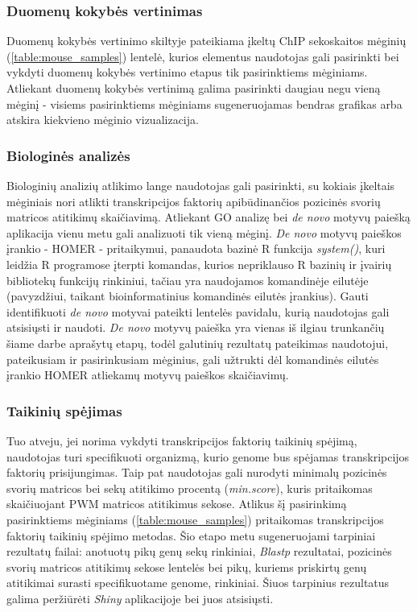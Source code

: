 \documentclass[12pt]{article}
\begin{document}
\subsubsection*{Duomenų kokybės vertinimas}
Duomenų kokybės vertinimo skiltyje pateikiama įkeltų ChIP sekoskaitos mėginių
(\ref{table:mouse_samples}) lentelė, kurios elementus naudotojas gali
pasirinkti bei vykdyti duomenų kokybės vertinimo etapus tik pasirinktiems
mėginiams. Atliekant duomenų kokybės vertinimą galima pasirinkti daugiau negu
vieną mėginį - visiems pasirinktiems mėginiams sugeneruojamas bendras grafikas
arba atskira kiekvieno mėginio vizualizacija.

\subsubsection*{Biologinės analizės}
Biologinių analizių atlikimo lange naudotojas gali pasirinkti, su kokiais
įkeltais mėginiais nori atlikti transkripcijos faktorių apibūdinančios pozicinės
svorių matricos atitikimų skaičiavimą. Atliekant GO analizę bei \emph{de novo}
motyvų paiešką aplikacija vienu metu gali analizuoti tik vieną mėginį.
\emph{De novo} motyvų paieškos įrankio - HOMER - pritaikymui, panaudota bazinė R
funkcija \emph{system()}, kuri leidžia R programose įterpti komandas, kurios
nepriklauso R bazinių ir įvairių bibliotekų funkcijų rinkiniui, tačiau yra
naudojamos komandinėje eilutėje (pavyzdžiui, taikant bioinformatinius komandinės
eilutės įrankius). Gauti identifikuoti \emph{de novo} motyvai pateikti
lentelės pavidalu, kurią naudotojas gali atsisiųsti ir naudoti. \emph{De novo}
motyvų paieška yra vienas iš ilgiau trunkančių šiame darbe aprašytų etapų, todėl
galutinių rezultatų pateikimas naudotojui, pateikusiam ir pasirinkusiam
mėginius, gali užtrukti dėl komandinės eilutės įrankio HOMER atliekamų motyvų
paieškos skaičiavimų.  

\subsubsection*{Taikinių spėjimas}
Tuo atveju, jei norima vykdyti transkripcijos faktorių taikinių spėjimą,
naudotojas turi specifikuoti organizmą, kurio genome bus spėjamas transkripcijos
faktorių prisijungimas. Taip pat naudotojas gali nurodyti minimalų pozicinės
svorių matricos bei sekų atitikimo procentą (\emph{min.score}), kuris
pritaikomas skaičiuojant PWM matricos atitikimus sekose. Atlikus šį pasirinkimą
pasirinktiems mėginiams (\ref{table:mouse_samples}) pritaikomas transkripcijos
faktorių taikinių spėjimo metodas. Šio etapo metu sugeneruojami tarpiniai
rezultatų failai: anotuotų pikų genų sekų rinkiniai, \emph{Blastp} rezultatai,
pozicinės svorių matricos atitikimų sekose lentelės bei pikų, kuriems priskirtų
genų atitikimai surasti specifikuotame genome, rinkiniai. Šiuos tarpinius
rezultatus galima per\-žiū\-rė\-ti \emph{Shiny} aplikacijoje bei juos
atsisiųsti.
\end{document}
